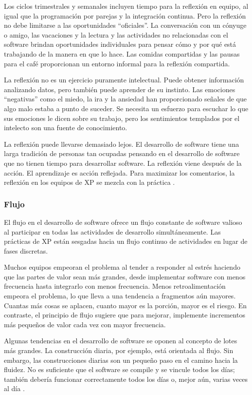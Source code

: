 \begin{spacing}{1.5}
			Los ciclos trimestrales y semanales incluyen tiempo para la reflexión en equipo, al igual que la programación por parejas y la integración continua. Pero la reflexión no debe limitarse a las oportunidades ``oficiales''. La conversación con un cónyuge o amigo, las vacaciones y la lectura y las actividades no relacionadas con el software brindan oportunidades individuales para pensar cómo y por qué está trabajando de la manera en que lo hace. Las comidas compartidas y las pausas para el café proporcionan un entorno informal para la reflexión compartida.
			
			La reflexión no es un ejercicio puramente intelectual. Puede obtener información analizando datos, pero también puede aprender de su instinto. Las emociones “negativas” como el miedo, la ira y la ansiedad han proporcionado señales de que algo malo estaba a punto de suceder. Se necesita un esfuerzo para escuchar lo que sus emociones le dicen sobre su trabajo, pero los sentimientos templados por el intelecto son una fuente de conocimiento.
			
			La reflexión puede llevarse demasiado lejos. El desarrollo de software tiene una larga tradición de personas tan ocupadas pensando en el desarrollo de software que no tienen tiempo para desarrollar software. La reflexión viene después de la acción. El aprendizaje es acción reflejada. Para maximizar los comentarios, la reflexión en los equipos de XP se mezcla con la práctica \cite{chap2_extreme_programming}.
		\subsubsection{Flujo}
			El flujo en el desarrollo de software ofrece un flujo constante de software valioso al participar en todas las actividades de desarrollo simultáneamente. Las prácticas de XP están sesgadas hacia un flujo continuo de actividades en lugar de fases discretas.
			
			 Muchos equipos empeoran el problema al tender a responder al estrés haciendo que las partes de valor sean más grandes, desde implementar software con menos frecuencia hasta integrarlo con menos frecuencia. Menos retroalimentación empeora el problema, lo que lleva a una tendencia a fragmentos aún mayores. Cuantas más cosas se aplacen, cuanto mayor es la porción, mayor es el riesgo. En contraste, el principio de flujo sugiere que para mejorar, implemente incrementos más pequeños de valor cada vez con mayor frecuencia.
			
			Algunas tendencias en el desarrollo de software se oponen al concepto de lotes más grandes. La construcción diaria, por ejemplo, está orientada al flujo. Sin embargo, las construcciones diarias son un pequeño paso en el camino hacia la fluidez. No es suficiente que el software se compile y se vincule todos los días; también debería funcionar correctamente todos los días o, mejor aún, varias veces al día \cite{chap2_extreme_programming}.

\end{spacing}
